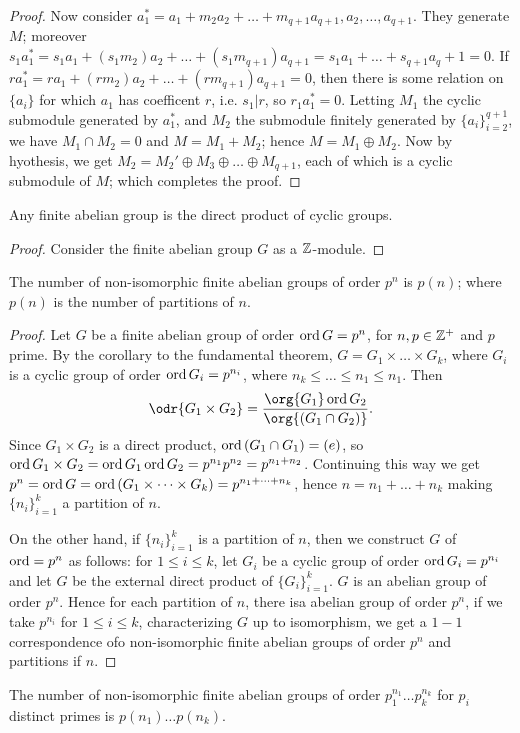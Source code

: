 \begin{proof}
    Now consider $a_1^*=a_1+m_2a_2+\dots+m_{q+1}a_{q+1},a_2, \dots, a_{q+1}$. They generate $M$;
    moreover  $s_1a_1^*=s_1a_1+(s_1m_2)a_2+\dots+(s_1m_{q+1})a_{q+1}=s_1a_1+\dots+s_{q+1}a_q+1=0$.
    If $ra_1^*=ra_1+(rm_2)a_2+\dots+(rm_{q+1})a_{q+1}=0$, then there is some relation on $\{a_i\}$
    for which $a_1$ has coefficent $r$, i.e.  $s_1|r$, so $r_1a_1^*=0$. Letting $M_1$ the cyclic
    submodule generated by $a_1^*$, and $M_2$ the submodule finitely generated by
    $\{a_i\}_{i=2}^{q+1}$, we have $M_1 \cap M_2=0$ and $M=M_1+M_2$; hence $M=M_1 \oplus M_2$. Now
    by hyothesis, we get $M_2=M_2' \oplus M_3 \oplus \dots \oplus M_{q+1}$, each of which is a
    cyclic submodule of $M$; which completes the proof.
\end{proof}
\begin{corollary}
    Any finite abelian group is the direct product of cyclic groups.
\end{corollary}
\begin{proof}
    Consider the finite abelian group $G$ as a  $\mathbb{Z}$-module.
\end{proof}

\begin{theorem}\label{1.5.2} 
    The number of non-isomorphic finite abelian groups of order $p^n$ is  $p(n)$; where $p(n)$ is the
    number of partitions of $n$.
\end{theorem}
\begin{proof}
    Let $G$ be a finite abelian group of order $\operatorname{ord}{G}=p^n$, for $n,p \in \mathbb{Z}^+$ and  $p$ prime. By
    the corollary to the fundamental theorem,  $G=G_1 \times \dots \times G_k$, where $G_i$ is a
    cyclic group of order  $\operatorname{ord}{G_i}=p^{n_i}$, where $n_k \leq \dots \leq n_1 \leq n_1$. Then
        \begin{equation*}
            \odr{G_1 \times G_2}=\frac{\org{G_1}\ord{G_2}}{\org{(G_1 \cap G_2)}}.
        \end{equation*}
        Since $G_1 \times G_2$ is a direct product, $\operatorname{ord}{(G_1 \cap G_1)}=(e)$, so $\operatorname{ord}{G_1 \times
        G_2}=\operatorname{ord}{G_1}\operatorname{ord}{G_2}=p^{n_1}p^{n_2}=p^{n_1+n_2}$. Continuing this way we get
        $p^n=\operatorname{ord}{G}=\operatorname{ord}{(G_1 \times \dots \times G_k)}=p^{n_1+\dots+n_k}$, hence $n=n_1+\dots+n_k$
        making $\{n_i\}_{i=1}^k$ a partition of $n$.

        On the other hand, if $\{n_i\}_{i=1}^k$ is a partition of $n$, then we construct  $G$ of
        $\operatorname{ord}=p^n$ as follows: for  $1 \leq i \leq k$, let  $G_i$ be a cyclic group of order
        $\operatorname{ord}{G_i}=p^{n_i}$ and let $G$ be the external direct product of  $\{G_i\}_{i=1}^k$. $G$ is
        an abelian group of order  $p^n$. Hence for each partition of  $n$, there isa abelian group
        of order  $p^n$, if we take  $p^{n_i}$ for $1 \leq i \leq k$, characterizing  $G$ up to
        isomorphism, we get a  $1-1$ correspondence ofo non-isomorphic finite abelian groups of
        order  $p^n$ and partitions if  $n$.
\end{proof}
\begin{corollary}
    The number of non-isomorphic finite abelian groups of order $p_1^{n_1} \dots p_k^{n_k}$ for
    $p_i$ distinct primes is  $p(n_1) \dots p(n_k)$.
\end{corollary}
